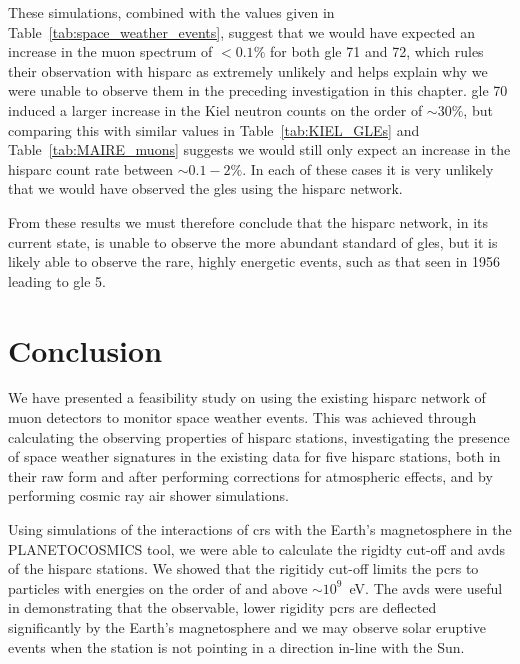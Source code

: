 These simulations, combined with the values given in Table~\ref{tab:space_weather_events}, suggest that we would have expected an increase in the muon spectrum of $< 0.1\%$ for both \gls{gle} 71 and 72, which rules their observation with \gls{hisparc} as extremely unlikely and helps explain why we were unable to observe them in the preceding investigation in this chapter. \gls{gle} 70 induced a larger increase in the Kiel neutron counts on the order of $\sim 30\%$, but comparing this with similar values in Table~\ref{tab:KIEL_GLEs} and Table~\ref{tab:MAIRE_muons} suggests we would still only expect an increase in the \gls{hisparc} count rate between $\sim 0.1 - 2 \%$. In each of these cases it is very unlikely that we would have observed the \glspl{gle} using the \gls{hisparc} network.

From these results we must therefore conclude that the \gls{hisparc} network, in its current state, is unable to observe the more abundant standard of \glspl{gle}, but it is likely able to observe the rare, highly energetic events, such as that seen in 1956 leading to \gls{gle} 5.



%




\section{Conclusion}\label{sec:HS_conclusion}

We have presented a feasibility study on using the existing \gls{hisparc} network of muon detectors to monitor space weather events. This was achieved through calculating the observing properties of \gls{hisparc} stations, investigating the presence of space weather signatures in the existing data for five \gls{hisparc} stations, both in their raw form and after performing corrections for atmospheric effects, and by performing cosmic ray air shower simulations.

Using simulations of the interactions of \glspl{cr} with the Earth's magnetosphere in the PLANETOCOSMICS tool, we were able to calculate the rigidty cut-off and \glspl{avd} of the \gls{hisparc} stations. We showed that the rigitidy cut-off limits the \glspl{pcr} to particles with energies on the order of and above $\sim 10^9$~eV. The \glspl{avd} were useful in demonstrating that the observable, lower rigidity \glspl{pcr} are deflected significantly by the Earth's magnetosphere and we may observe solar eruptive events when the station is not pointing in a direction in-line with the Sun.

